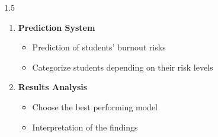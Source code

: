 \begin{spacing}{1.5}
\begin{enumerate}
\item \textbf{Prediction System}
\begin{itemize}
    \item Prediction of students’ burnout risks
    \item Categorize students depending on their risk levels
\end{itemize}

\item \textbf{Results Analysis}
\begin{itemize}
    \item Choose the best performing model
    \item Interpretation of the findings
\end{itemize}
\end{enumerate}



\end{spacing}